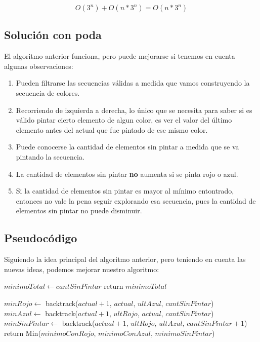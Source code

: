 $$O(3^n) + O(n * 3^n) = O(n * 3^n) $$


\subsection{Solución con poda}

El algoritmo anterior funciona, pero puede mejorarse si tenemos en cuenta algunas observaciones:

\begin{enumerate}
\item Pueden filtrarse las secuencias válidas a medida que vamos construyendo la secuencia de colores.
\item Recorriendo de izquierda a derecha, lo único que se necesita para saber si es válido pintar cierto elemento de algun color, es ver el valor del último elemento antes del actual que fue pintado de ese mismo color.
\item Puede conocerse la cantidad de elementos sin pintar a medida que se va pintando la secuencia.
\item La cantidad de elementos sin pintar \textbf{no} aumenta si se pinta rojo o azul.
\item Si la cantidad de elementos sin pintar es mayor al mínimo entontrado, entonces no vale la pena seguir explorando esa secuencia, pues la cantidad de elementos sin pintar no puede disminuir.
\end{enumerate}

\subsection{Pseudocódigo}

Siguiendo la idea principal del algoritmo anterior, pero teniendo en cuenta las nuevas ideas, podemos mejorar nuestro algoritmo:

\begin{algorithm}[H]
\begin{algorithmic}

    \State $minimoTotal \gets cantSinPintar$
    \State return $minimoTotal$
\Else

    \State $minRojo \gets$ backtrack($actual + 1$, $actual$, $ultAzul$, $cantSinPintar$)
  \EndIf \\

    \State $minAzul \gets$ backtrack($actual + 1$, $ultRojo$, $actual$, $cantSinPintar$)
  \EndIf \\

    \State $minSinPintar \gets$ backtrack($actual + 1$, $ultRojo$, $ultAzul$, $cantSinPintar + 1$)
  \EndIf \\

  \State return Min($minimoConRojo$, $minimoConAzul$, $minimoSinPintar$)

\EndIf
\EndProcedure
\end{algorithmic}
\end{algorithm}



